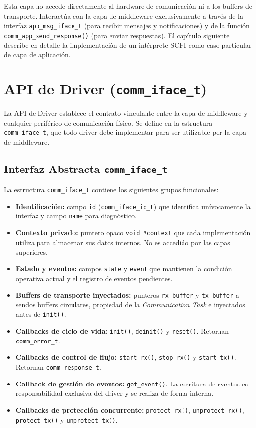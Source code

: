 Esta capa no accede directamente al hardware de comunicación ni a los buffers de transporte. Interactúa con la capa de middleware exclusivamente a través de la interfaz \texttt{app\_msg\_iface\_t} (para recibir mensajes y notificaciones) y de la función \texttt{comm\_app\_send\_response()} (para enviar respuestas). El capítulo siguiente describe en detalle la implementación de un intérprete SCPI como caso particular de capa de aplicación.

\section{API de Driver (\texttt{comm\_iface\_t})}
\label{sec:api-driver}

La API de Driver establece el contrato vinculante entre la capa de middleware y cualquier periférico de comunicación físico. Se define en la estructura \texttt{comm\_iface\_t}, que todo driver debe implementar para ser utilizable por la capa de middleware.

\subsection{Interfaz Abstracta \texttt{comm\_iface\_t}}
\label{subsec:comm-iface}

La estructura \texttt{comm\_iface\_t} contiene los siguientes grupos funcionales:

\begin{itemize}
    \item \textbf{Identificación:} campo \texttt{id} (\texttt{comm\_iface\_id\_t}) que identifica unívocamente la interfaz y campo \texttt{name} para diagnóstico.
    \item \textbf{Contexto privado:} puntero opaco \texttt{void *context} que cada implementación utiliza para almacenar sus datos internos. No es accedido por las capas superiores.
    \item \textbf{Estado y eventos:} campos \texttt{state} y \texttt{event} que mantienen la condición operativa actual y el registro de eventos pendientes.
    \item \textbf{Buffers de transporte inyectados:} punteros \texttt{rx\_buffer} y \texttt{tx\_buffer} a sendos buffers circulares, propiedad de la \textit{Communication Task} e inyectados antes de \texttt{init()}.
    \item \textbf{Callbacks de ciclo de vida:} \texttt{init()}, \texttt{deinit()} y \texttt{reset()}. Retornan \texttt{comm\_error\_t}.
    \item \textbf{Callbacks de control de flujo:} \texttt{start\_rx()}, \texttt{stop\_rx()} y \texttt{start\_tx()}. Retornan \texttt{comm\_response\_t}.
    \item \textbf{Callback de gestión de eventos:} \texttt{get\_event()}. La escritura de eventos es responsabilidad exclusiva del driver y se realiza de forma interna.
    \item \textbf{Callbacks de protección concurrente:} \texttt{protect\_rx()}, \texttt{unprotect\_rx()}, \texttt{protect\_tx()} y \texttt{unprotect\_tx()}.
\end{itemize}

